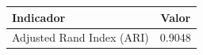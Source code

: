 \begin{tabular}{lc}
\toprule
Indicador & Valor \\
\midrule
Adjusted Rand Index (ARI) & 0.9048 \\
\bottomrule
\end{tabular}